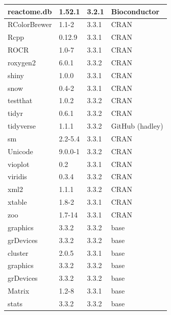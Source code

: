 \begin{longtable}{|llll|}
reactome.db  & 1.52.1         & 3.2.1 & Bioconductor    \\ \hline  \rowcolor{gray!25}
RColorBrewer & 1.1-2          & 3.3.1 & CRAN            \\ \hline
Rcpp         & 0.12.9         & 3.3.1 & CRAN            \\ \hline  \rowcolor{gray!25}
ROCR         & 1.0-7          & 3.3.1 & CRAN            \\ \hline
roxygen2     & 6.0.1          & 3.3.2 & CRAN            \\ \hline  \rowcolor{gray!25}
shiny        & 1.0.0          & 3.3.1 & CRAN            \\ \hline
snow         & 0.4-2          & 3.3.1 & CRAN            \\ \hline  \rowcolor{gray!25}
testthat     & 1.0.2          & 3.3.2 & CRAN            \\ \hline
tidyr        & 0.6.1          & 3.3.2 & CRAN            \\ \hline  \rowcolor{gray!25}
tidyverse    & 1.1.1          & 3.3.2 & GitHub (hadley) \\ \hline
sm           & 2.2-5.4        & 3.3.1 & CRAN            \\ \hline  \rowcolor{gray!25}
Unicode      & 9.0.0-1        & 3.3.2 & CRAN            \\ \hline
vioplot      & 0.2            & 3.3.1 & CRAN            \\ \hline  \rowcolor{gray!25}
viridis      & 0.3.4          & 3.3.2 & CRAN            \\ \hline
xml2         & 1.1.1          & 3.3.2 & CRAN            \\ \hline  \rowcolor{gray!25}
xtable       & 1.8-2          & 3.3.1 & CRAN            \\ \hline
zoo          & 1.7-14         & 3.3.1 & CRAN            \\ \hline  \rowcolor{gray!25}
graphics     & 3.3.2          & 3.3.2 & base            \\ \hline
grDevices    & 3.3.2          & 3.3.2 & base            \\ \hline  \rowcolor{gray!25}
cluster      & 2.0.5          & 3.3.1 & base            \\ \hline
graphics     & 3.3.2          & 3.3.2 & base            \\ \hline  \rowcolor{gray!25}
grDevices    & 3.3.2          & 3.3.2 & base            \\ \hline
Matrix       & 1.2-8          & 3.3.1 & base            \\ \hline  \rowcolor{gray!25}
stats        & 3.3.2          & 3.3.2 & base            \\ \hline
\end{longtable}


